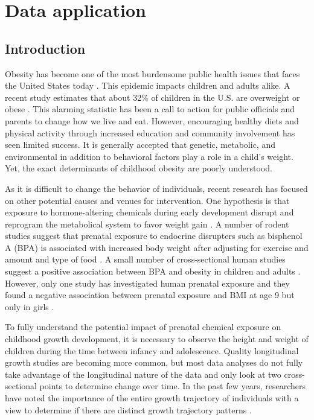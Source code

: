 \chapter{Data application}
\label{chap:data}
\section{Introduction}
Obesity has become one of the most burdensome public health issues that faces the United States today \cite{surgeon2001}.  This epidemic impacts children and adults alike.  A recent study estimates that about 32\% of children in the U.S. are overweight or obese \cite{ogden2008}. This alarming statistic has been a call to action for public officials and parents to change how we live and eat. However, encouraging healthy diets and physical activity through increased education and community involvement has seen limited success.  It is generally accepted that genetic, metabolic, and environmental in addition to behavioral factors play a role in a child's weight. Yet, the exact determinants of childhood obesity are poorly understood.

As it is difficult to change the behavior of individuals, recent research has focused on other potential causes and venues for intervention. One hypothesis is that exposure to hormone-altering chemicals during early development disrupt and reprogram the metabolical system to favor weight gain \cite{tuma2007}. A number of rodent studies suggest that prenatal exposure to endocrine disrupters such as bisphenol A (BPA) is associated with increased body weight after adjusting for exercise and amount and type of food \cite{rubin2001,akingbemi2004,hiyama2011, howdeshell1999,miyawaki2007,somm2009,wei2011,xu2011}. A small number of cross-sectional human studies suggest a positive association between BPA and obesity in children and adults \cite{carwile2011,shankar2012,trasande2012}. However, only one study has investigated human prenatal exposure and they found a negative association between prenatal exposure and BMI at age 9 but only in girls \cite{harley2013}.
 
 To fully understand the potential impact of prenatal chemical exposure on childhood growth development, it is necessary to observe the height and weight of children during the time between infancy and adolescence. Quality longitudinal growth studies are becoming more common, but most data analyses do not fully take advantage of the longitudinal nature of the data and only look at two cross-sectional points to determine change over time. In the past few years, researchers have noted the importance of the entire growth trajectory of individuals with a view to determine if there are distinct growth trajectory patterns \cite{pryor2011,carter2012,li2007,garden2012}. 

